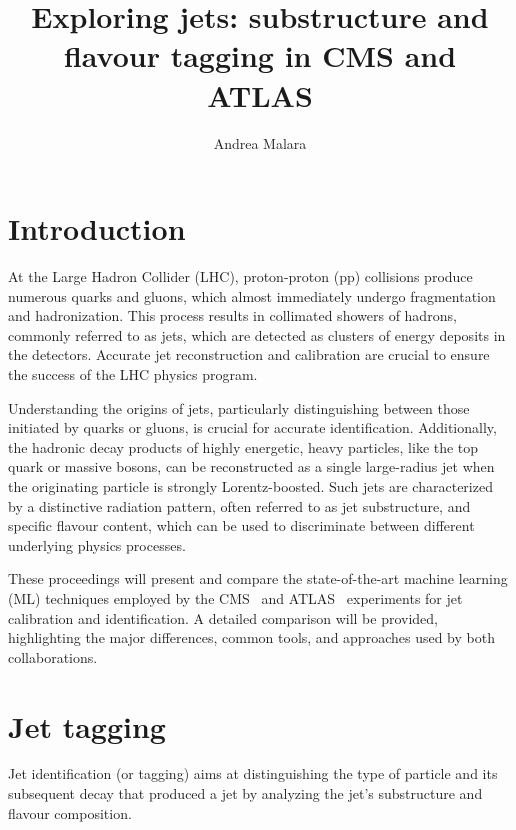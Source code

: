 \documentclass[a4paper,11pt]{article}
\title{Exploring jets: substructure and flavour tagging in CMS and ATLAS}
\author*[a]{Andrea Malara}
\affiliation[a]{Universite Libre de Bruxelles (ULB),\\
Av. Franklin Roosevelt 50, 1050 Bruxelles, Belgium}
\begin{document}
\maketitle


\section{Introduction}

At the Large Hadron Collider (LHC), proton-proton (pp) collisions produce numerous quarks and gluons,
which almost immediately undergo fragmentation and hadronization.
This process results in collimated showers of hadrons, commonly referred to as jets,
which are detected as clusters of energy deposits in the detectors.
Accurate jet reconstruction and calibration are crucial to ensure the success of the LHC physics program.

Understanding the origins of jets, particularly distinguishing between those initiated by quarks or gluons,
is crucial for accurate identification.
Additionally, the hadronic decay products of highly energetic, heavy particles,
like the top quark or massive bosons, can be reconstructed as a single large-radius jet
when the originating particle is strongly Lorentz-boosted.
Such jets are characterized by a distinctive radiation pattern, often referred to as jet substructure,
and specific flavour content, which can be used to discriminate between different underlying physics processes.

These proceedings will present and compare the state-of-the-art machine learning (ML) techniques employed
by the CMS~\cite{CMS:2008xjf} and ATLAS~\cite{ATLAS:2008xda} experiments for jet calibration and identification.
A detailed comparison will be provided, highlighting the major differences,
common tools, and approaches used by both collaborations.

\section{Jet tagging}

Jet identification (or tagging) aims at distinguishing the type of particle
and its subsequent decay that produced a jet by analyzing the jet's substructure and flavour composition.
\end{document}
